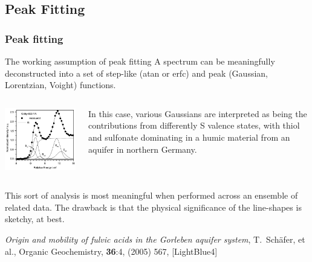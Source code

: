 \documentclass[10pt, xcolor=x11names, compress]{beamer}
\begin{document}
\subsection[Peak]{Peak Fitting}

\begin{frame}
  \frametitle{Peak fitting}

  \begin{block}{The working assumption of peak fitting}
    A spectrum can be meaningfully deconstructed into a set of
    step-like (atan or erfc) and peak (Gaussian, Lorentzian, Voight)
    functions.
  \end{block}

  \begin{columns}
    \begin{column}{0.4\linewidth}
      \begin{center}
        \includegraphics[width=0.9\linewidth]{images/S_peak.png}
      \end{center}
    \end{column}
    \begin{column}{0.6\linewidth}
      In this case, various Gaussians are interpreted as being the
      contributions from differently S valence states, with thiol and
      sulfonate dominating in a humic material from an aquifer in
      northern Germany.
    \end{column}
  \end{columns}

  This sort of analysis is most meaningful when performed across an
  ensemble of related data.  The drawback is that the physical
  significance of the line-shapes is sketchy, at best.

  \begin{bottomnote}[0.7][19.25]
    \textit{Origin and mobility of fulvic acids in the Gorleben
      aquifer system}, T.\ Sch\"afer, et al., Organic
    Geochemistry, \textbf{36}:4, (2005) 567,
    [LightBlue4]
  \end{bottomnote}
\end{frame}
\end{document}
